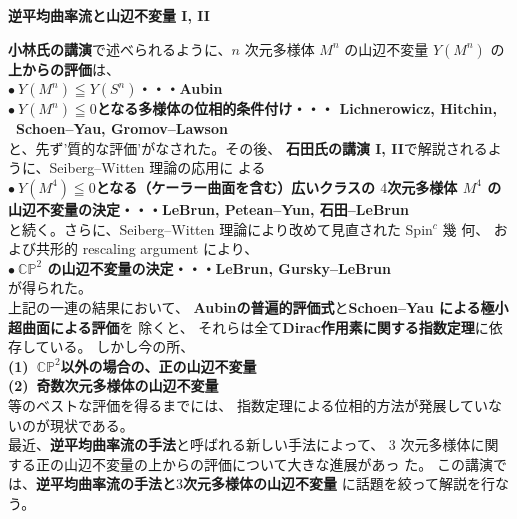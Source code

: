 \documentclass[uplatex,dvipdfmx]{jlreq}
\begin{document}
\newpage

\begin{center}
{\large\bfseries 逆平均曲率流と山辺不変量 I, II}\\[6pt]
\hspace*{\fill}{\large\bfseries 芥川 和雄（東京理科大・理工）}
\end{center}

\textbf{小林氏の講演}で述べられるように、$n$ 次元多様体 $M^n$ の山辺不変量
$Y(M^n)$ の
\textbf{上からの評価}は、\\
\textbf{$\bullet\ Y(M^n) \leqq Y(S^n)$・・・Aubin} \\
\textbf{$\bullet\ Y(M^n) \leqq 0$となる多様体の位相的条件付け・・・
Lichnerowicz, Hitchin, \\
\qquad \qquad \qquad \qquad \qquad \qquad \qquad \qquad \qquad \
Schoen--Yau, Gromov--Lawson} \\
と、先ず'質的な評価'がなされた。その後、
\textbf{石田氏の講演 I, II}で解説されるように、Seiberg--Witten 理論の応用に
よる
\\
\textbf{$\bullet\ Y(M^4) \leqq 0$となる（ケーラー曲面を含む）広いクラスの
$4$次元多様体 $M^4$ の \\
\quad 山辺不変量の決定・・・LeBrun, Petean--Yun, 石田--LeBrun} \\
と続く。さらに、Seiberg--Witten 理論により改めて見直された Spin${}^c$ 幾
何、
および共形的 rescaling argument により、\\
\textbf{$\bullet\ \mathbb{CP}^2$ の山辺不変量の決定・・・LeBrun,
Gursky--LeBrun} \\
が得られた。\\
\quad 上記の一連の結果において、
\textbf{Aubinの普遍的評価式}と\textbf{Schoen--Yau による極小超曲面による評価}を
除くと、
それらは全て\textbf{Dirac作用素に関する指数定理}に依存している。
しかし今の所、\\
\textbf{(1)\ $\mathbb{CP}^2$以外の場合の、正の山辺不変量} \\
\textbf{(2)\ 奇数次元多様体の山辺不変量} \\
等のベストな評価を得るまでには、
指数定理による位相的方法が発展していないのが現状である。\\
\quad 最近、\textbf{逆平均曲率流の手法}と呼ばれる新しい手法によって、
$3$ 次元多様体に関する正の山辺不変量の上からの評価について大きな進展があっ
た。
この講演では、\textbf{逆平均曲率流の手法と$3$次元多様体の山辺不変量}
に話題を絞って解説を行なう。
\end{document}
